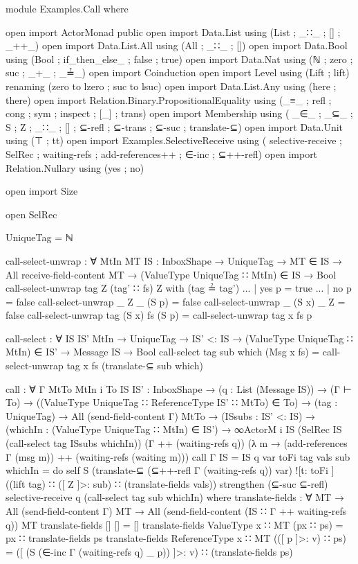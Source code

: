 \begin{code}
module Examples.Call where

open import ActorMonad public
open import Data.List using (List ; _∷_ ; [] ; _++_)
open import Data.List.All using (All ; _∷_ ; [])
open import Data.Bool using (Bool ; if_then_else_ ; false ; true)
open import Data.Nat using (ℕ ; zero ; suc ; _+_ ; _≟_)
open import Coinduction
open import Level using (Lift ; lift) renaming (zero to lzero ; suc to lsuc)
open import Data.List.Any using (here ; there)
open import Relation.Binary.PropositionalEquality
            using (_≡_ ; refl ; cong ; sym ; inspect ; [_] ; trans)
open import Membership using (
            _∈_ ; _⊆_ ; S ; Z ; _∷_ ; [] ; ⊆-refl
            ; ⊆-trans ; ⊆-suc ; translate-⊆)
open import Data.Unit using (⊤ ; tt)
open import Examples.SelectiveReceive using (
            selective-receive ; SelRec ; waiting-refs
            ; add-references++ ; ∈-inc ; ⊆++-refl)
open import Relation.Nullary using (yes ; no)

open import Size

open SelRec

UniqueTag = ℕ

call-select-unwrap : ∀ {MtIn MT} {IS : InboxShape} →
                     UniqueTag →
                     MT ∈ IS →
                     All receive-field-content MT →
                     (ValueType UniqueTag ∷ MtIn) ∈ IS →
                     Bool
call-select-unwrap tag Z (tag' ∷ fs) Z with (tag ≟ tag')
... | yes p = true
... | no p = false
call-select-unwrap _ Z _ (S p) = false
call-select-unwrap _ (S x) _ Z = false
call-select-unwrap tag (S x) fs (S p) = call-select-unwrap tag x fs p

call-select : ∀ {IS IS' MtIn} →
              UniqueTag →
              IS' <: IS →
              (ValueType UniqueTag ∷ MtIn) ∈ IS' →
              Message IS →
              Bool
call-select tag sub which (Msg x fs) =
  call-select-unwrap tag x fs (translate-⊆  sub which)

call : ∀ {Γ MtTo MtIn i} {To IS IS' : InboxShape} →
       (q : List (Message IS)) →
       (Γ ⊢ To) →
       ((ValueType UniqueTag ∷ ReferenceType IS' ∷ MtTo) ∈ To) →
       (tag : UniqueTag) →
       All (send-field-content Γ) MtTo →
       (ISsubs : IS' <: IS) →
       (whichIn : (ValueType UniqueTag ∷ MtIn) ∈ IS') →
       ∞ActorM i IS
         (SelRec IS (call-select tag ISsubs whichIn))
         (Γ ++ (waiting-refs q))
         (λ m → (add-references Γ (msg m)) ++ (waiting-refs (waiting m)))
call {Γ} {IS = IS} q var toFi tag vals sub whichIn = do
     self
     S (translate-⊆ (⊆++-refl Γ (waiting-refs q)) var)
       ![t: toFi ]
       ((lift tag) ∷ ([ Z ]>: sub) ∷ (translate-fields vals))
     strengthen (⊆-suc ⊆-refl)
     selective-receive q (call-select tag sub whichIn)
  where
    translate-fields : ∀ {MT} → All (send-field-content  Γ) MT →
                         All (send-field-content (IS ∷ Γ ++ waiting-refs q)) MT
    translate-fields {[]} [] = []
    translate-fields {ValueType x ∷ MT} (px ∷ ps) =
      px ∷ translate-fields ps
    translate-fields {ReferenceType x ∷ MT} (([ p ]>: v) ∷ ps) =
      ([ (S (∈-inc Γ (waiting-refs q) _ p)) ]>: v) ∷ (translate-fields ps)


\end{code}
